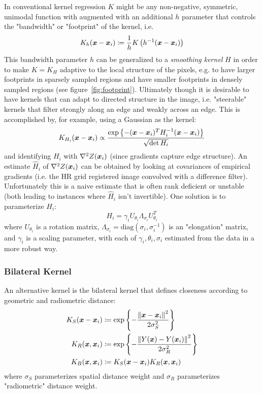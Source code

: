 In conventional kernel regression $K$ might be any non-negative, symmetric, unimodal\cite{wand1994kernel} function with augmented with an additional $h$ parameter that controls the "bandwidth" or "footprint" of the kernel, i.e.
\begin{equation}
	K_h(\bm{x} - \bm{x}_i) \coloneqq \frac{1}{h}K\left( h^{-1}(\bm{x} - \bm{x}_i) \right)
\end{equation}
This bandwidth parameter $h$ can be generalized to a \textit{smoothing kernel} $H$ in order to make $K = K_H$ adaptive to the local structure of the pixels, e.g. to have larger footprints in sparsely sampled regions and have smaller footprints in densely sampled regions (see figure~\ref{fig:footprint}).
%
Ultimately though it is desirable to have kernels that can adapt to directed structure in the image, i.e. "steerable" kernels that filter strongly along an edge and weakly across an edge.
%
This is accomplished by, for example, using a Gaussian as the kernel:
\begin{equation}
	K_{H_i}(\bm{x} - \bm{x}_i) \propto \frac{\exp\left\{ -(\bm{x} - \bm{x}_i)^T H^{-1}_i (\bm{x} - \bm{x}_i) \right\}}{\sqrt{\det{H_i}}}
\end{equation}
and identifying $H_i$ with $\nabla^2 Z(\bm{x}_i)$ (since gradients capture edge structure).
%
An estimate $\hat{H}_i$ of $\nabla^2 Z(\bm{x}_i)$ can be obtained by looking at covariances of empirical gradients (i.e. the HR grid registered image convolved with a difference filter).
%
Unfortunately this is a naive estimate that is often rank deficient or unstable (both leading to instances where $\hat{H}_i$ isn't invertible).
%
One solution is to parameterize $H_i$:
\[
	H_i = \gamma_i U_{\theta_i} \Lambda_{\sigma_i} U_{\theta_i}^T
\]
where $U_{\theta_i}$ is a rotation matrix, $\Lambda_{\sigma_i} = \text{diag}\left( \sigma_i, \sigma_i^{-1} \right)$ is an "elongation" matrix, and $\gamma_i$ is a scaling parameter, with each of $\gamma_i, \theta_i, \sigma_i$ estimated from the data in a more robust way.
%
\subsubsection{Bilateral Kernel}
An alternative kernel is the bilateral kernel\cite{Tomasi:1998:BFG:938978.939190} that defines closeness according to geometric and radiometric distance:
\begin{equation}
	\begin{split}
		K_S(\delx) &\coloneqq \exp \left\{ -\frac{\left\| \delx \right\|^2}{2 \sigma_S^2}  \right\} \\
		K_R(\bx, \bxi) &\coloneqq \exp \left\{ -  \frac{\left\| Y(\bx) - Y(\bxi) \right\|^2}{2 \sigma_R^2} \right\} \\
		K_B(\bx, \bxi) &\coloneqq K_S(\delx)K_R(\bx, \bxi)
	\end{split}
	\label{eqn:bilateralkernel}
\end{equation}
where $\sigma_S$ parameterizes spatial distance weight and $\sigma_R$ parameterizes "radiometric" distance weight.

